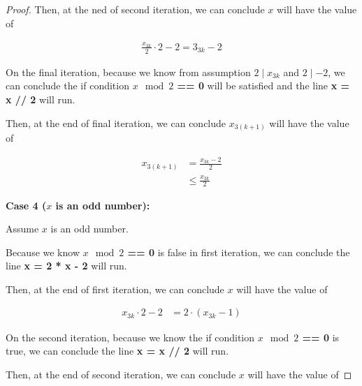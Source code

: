 \documentclass[12pt]{article}
\begin{document}
\begin{enumerate}[a.]
\begin{proof}
        \bigskip

        Then, at the ned of second iteration, we can conclude $x$ will have the
        value of

        \begin{align}
            \frac{x_{3k}}{2} \cdot 2 - 2 = 3_{3k} - 2
        \end{align}

        \bigskip

        On the final iteration, because we know from assumption $2 \mid x_{3k}$ and $2 \mid -2$,
        we can conclude the if condition \textbf{$x \mod 2$ == 0} will be satisfied
        and the line \textbf{x = x // 2} will run.

        \bigskip

        Then, at the end of final iteration, we can conclude $x_{3(k+1)}$ will
        have the value of

        \begin{align}
            x_{3(k+1)} &= \frac{x_{3k} - 2}{2}\\
            &\leq \frac{x_{3k}}{2}
        \end{align}

        \bigskip

        \textbf{Case 4 ($x$ is an odd number):}

        \bigskip

        Assume $x$ is an odd number.

        \bigskip

        Because we know \textbf{$x \mod 2$ == 0} is false in first iteration,
        we can conclude the line \textbf{x = 2 * x - 2} will run.

        \bigskip

        Then, at the end of first iteration, we can conclude $x$ will have the
        value of

        \begin{align}
            x_{3k} \cdot 2 - 2 &= 2 \cdot (x_{3k} - 1)
        \end{align}

        \bigskip

        On the second iteration, because we know the if condition \textbf{$x \mod 2$ == 0}
        is true, we can conclude the line \textbf{x = x // 2} will run.

        \bigskip

        Then, at the end of second iteration, we can conclude $x$ will have the
        value of


\end{proof}
\end{enumerate}
\end{document}
